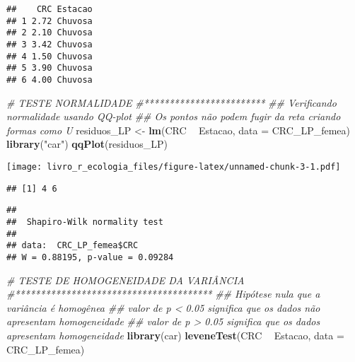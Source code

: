 \documentclass[
]{book}
\newenvironment{Shaded}{\begin{snugshade}}{\end{snugshade}}
\newcommand{\CommentTok}[1]{\textcolor[rgb]{0.56,0.35,0.01}{\textit{#1}}}
\newcommand{\DataTypeTok}[1]{\textcolor[rgb]{0.13,0.29,0.53}{#1}}
\newcommand{\KeywordTok}[1]{\textcolor[rgb]{0.13,0.29,0.53}{\textbf{#1}}}
\newcommand{\NormalTok}[1]{#1}
\newcommand{\OperatorTok}[1]{\textcolor[rgb]{0.81,0.36,0.00}{\textbf{#1}}}
\newcommand{\StringTok}[1]{\textcolor[rgb]{0.31,0.60,0.02}{#1}}
\begin{document}
\begin{verbatim}
##    CRC Estacao
## 1 2.72 Chuvosa
## 2 2.10 Chuvosa
## 3 3.42 Chuvosa
## 4 1.50 Chuvosa
## 5 3.90 Chuvosa
## 6 4.00 Chuvosa
\end{verbatim}

\begin{Shaded}
\begin{Highlighting}[]
\CommentTok{# TESTE NORMALIDADE}
\CommentTok{#************************}
\CommentTok{## Verificando normalidade usando QQ-plot}
\CommentTok{## Os pontos não podem fugir da reta criando formas como U}
\NormalTok{residuos_LP <-}\StringTok{ }\KeywordTok{lm}\NormalTok{(CRC }\OperatorTok{~}\StringTok{ }\NormalTok{Estacao, }\DataTypeTok{data =}\NormalTok{ CRC_LP_femea)}
\KeywordTok{library}\NormalTok{(}\StringTok{"car"}\NormalTok{)}
\KeywordTok{qqPlot}\NormalTok{(residuos_LP)}
\end{Highlighting}
\end{Shaded}

\texttt{[image: livro\_r\_ecologia\_files/figure-latex/unnamed-chunk-3-1.pdf]}

\begin{verbatim}
## [1] 4 6
\end{verbatim}

\begin{Shaded}
\end{Shaded}

\begin{verbatim}
## 
## 	Shapiro-Wilk normality test
## 
## data:  CRC_LP_femea$CRC
## W = 0.88195, p-value = 0.09284
\end{verbatim}

\begin{Shaded}
\begin{Highlighting}[]
\CommentTok{# TESTE DE HOMOGENEIDADE DA VARIÂNCIA}
\CommentTok{#***************************************}
\CommentTok{## Hipótese nula que a variância é homogênea}
\CommentTok{## valor de p < 0.05 significa que os dados não apresentam homogeneidade}
\CommentTok{## valor de p > 0.05 significa que os dados apresentam homogeneidade}
\KeywordTok{library}\NormalTok{(car)}
\KeywordTok{leveneTest}\NormalTok{(CRC }\OperatorTok{~}\StringTok{ }\NormalTok{Estacao, }\DataTypeTok{data =}\NormalTok{ CRC_LP_femea)}
\end{Highlighting}
\end{Shaded}
\end{document}
